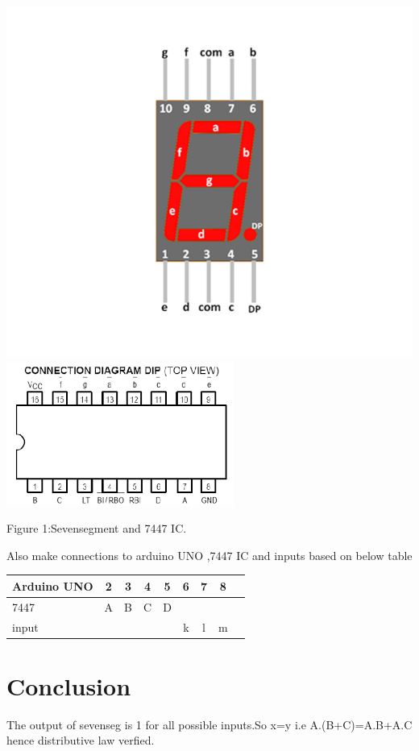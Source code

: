 \documentclass[10pt, a4paper]{article}
\begin{document}
\begin{center}

\includegraphics[scale=.20]{lcde.png}
\includegraphics[scale=.20]{7447.png}


\end{center}
Figure 1:Sevensegment and 7447 IC.

Also make connections to arduino UNO ,7447 IC and inputs based on below table

\begin{table}[htbp]
 \begin{center}
    \begin{tabular}{|l|c|c|c|c|c|c|c|c} \hline \textbf{Arduino UNO}
  & \textbf{2} & \textbf{3} & \textbf{4}& \textbf{5}& \textbf{6}& \textbf{7}& \textbf{8} \\
 \hline
7447&A&B&C&D&&& \\ \hline
input&&&&&k&l&m \\ \hline

\end{tabular}   
\end{center}
\end{table}
\section{Conclusion}
The output of sevenseg  is 1 for all possible inputs.So x=y i.e  A.(B+C)=A.B+A.C hence distributive law verfied.
\end{document}
